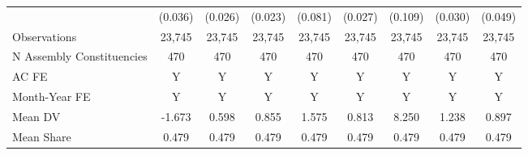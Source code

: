 {\begin{tabular}{l*{8}{c}}
            &     (0.036)         &     (0.026)         &     (0.023)         &     (0.081)         &     (0.027)         &     (0.109)         &     (0.030)         &     (0.049)         \\
Observations&      23,745         &      23,745         &      23,745         &      23,745         &      23,745         &      23,745         &      23,745         &      23,745         \\
N Assembly Constituencies&         470         &         470         &         470         &         470         &         470         &         470         &         470         &         470         \\
AC FE       &           Y         &           Y         &           Y         &           Y         &           Y         &           Y         &           Y         &           Y         \\
Month-Year FE&           Y         &           Y         &           Y         &           Y         &           Y         &           Y         &           Y         &           Y         \\
Mean DV     &      -1.673         &       0.598         &       0.855         &       1.575         &       0.813         &       8.250         &       1.238         &       0.897         \\
Mean Share  &       0.479         &       0.479         &       0.479         &       0.479         &       0.479         &       0.479         &       0.479         &       0.479         \\
\bottomrule
\end{tabular}
}
